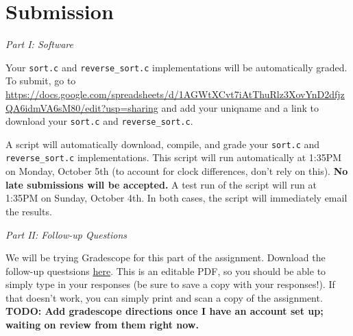 \documentclass{article}
\begin{document}
\section*{Submission}

\emph{Part I: Software}

\medskip
\noindent
Your \texttt{sort.c} and \texttt{reverse\_sort.c} implementations will be
automatically graded. To submit, go to
\url{https://docs.google.com/spreadsheets/d/1AGWtXCvt7iAtThuRlz3XovYnD2dfjzQA6idmVA6sM80/edit?usp=sharing}
and add your uniqname and a link to download your \texttt{sort.c} and
\texttt{reverse\_sort.c}.

\medskip
\noindent
A script will automatically download, compile, and grade your \texttt{sort.c}
and \texttt{reverse\_sort.c} implementations. This script will run
automatically at 1:35PM on Monday, October 5th (to account for clock
differences, don't rely on this).
\textbf{\color{red}No late submissions will be accepted.}
A test run of the script will run at 1:35PM on Sunday, October 4th. In both
cases, the script will immediately email the results.


\bigskip
\noindent
\emph{Part II: Follow-up Questions}

\medskip
\noindent
We will be trying Gradescope for this part of the assignment. Download the follow-up questsions
\href{http://web.eecs.umich.edu/~prabal/teaching/eecs373/homeworks/373-F15-HW4-followup.pdf}{here}.
This is an editable PDF, so you should be able to simply type in your
responses (be sure to save a copy with your responses!). If that doesn't work,
you can simply print and scan a copy of the assignment.
\textbf{TODO: Add gradescope directions once I have an account set up; waiting
on review from them right now.}
\end{document}
